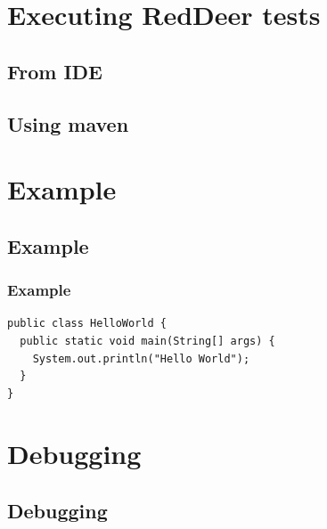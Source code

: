 \documentclass{beamer}
\begin{document}
\section{Executing RedDeer tests}
\subsection{From IDE}
\subsection{Using maven}


\section{Example}
\subsection{Example}
\begin{frame}[fragile]
\frametitle{Example}
\begin{lstlisting}
public class HelloWorld {
  public static void main(String[] args) {
    System.out.println("Hello World");
  }
}
\end{lstlisting}
\end{frame}

\section{Debugging}
\subsection{Debugging}
\end{document}
